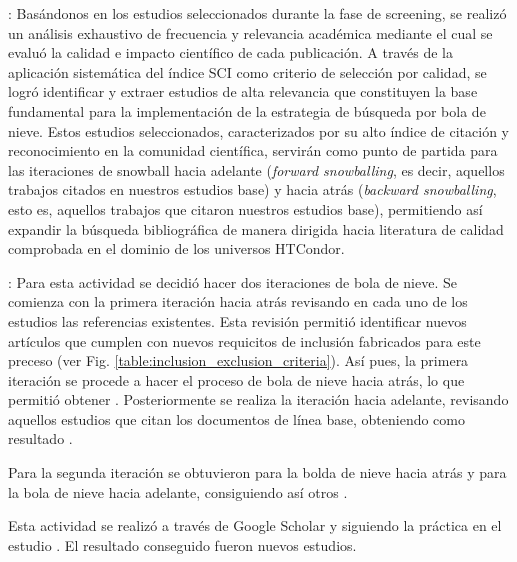 : Basándonos en los \screenTot{} estudios seleccionados durante la fase de screening, se realizó un análisis exhaustivo de frecuencia y relevancia académica mediante el cual se evaluó la calidad e impacto científico de cada publicación. A través de la aplicación sistemática del índice SCI  como criterio de selección por calidad, se logró identificar y extraer \csiSelected{} estudios de alta relevancia que constituyen la base fundamental para la implementación de la estrategia de búsqueda por bola de nieve. Estos estudios seleccionados, caracterizados por su alto índice de citación y reconocimiento en la comunidad científica, servirán como punto de partida para las iteraciones de snowball hacia adelante (\textit{forward snowballing}, es decir, aquellos trabajos citados en nuestros estudios base) y hacia atrás (\textit{backward snowballing}, esto es, aquellos trabajos que citaron nuestros estudios base), permitiendo así expandir la búsqueda bibliográfica de manera dirigida hacia literatura de calidad comprobada en el dominio de los universos HTCondor.



: Para esta actividad se decidió hacer dos iteraciones de bola de nieve. Se comienza con la primera iteración hacia atrás revisando en cada uno de los \csiSelected{} estudios las referencias existentes. Esta revisión permitió identificar nuevos artículos que cumplen con nuevos requicitos de inclusión fabricados para este preceso (ver Fig. \ref{table:inclusion_exclusion_criteria}). Así pues, la primera iteración se procede a hacer el proceso de bola de nieve hacia atrás, lo que permitió obtener \firstBackwardSnowballStudies.  Posteriormente se realiza la iteración hacia adelante, revisando aquellos estudios que citan los documentos de línea base, obteniendo como resultado \firstForwardSnowballStudies{}.

Para la segunda iteración se obtuvieron \secondBackwardSnowballStudies{} para la bolda de nieve hacia atrás y \secondForwardSnowballStudies{} para la bola de nieve hacia adelante, consiguiendo así otros \secondSnowballIterationStudies{}.


Esta actividad se realizó a través de Google Scholar y siguiendo la práctica en el estudio \cite{Ali-01}. El resultado conseguido fueron \snowballNewStudies{} nuevos estudios.

